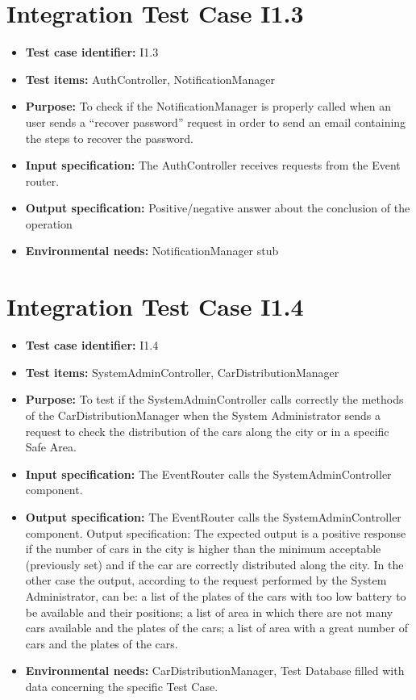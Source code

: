 \section{Integration Test Case I1.3}
\begin{itemize}
\item \textbf{Test case identifier:} I1.3
\item \textbf{Test items:} AuthController, NotificationManager
\item \textbf{Purpose:} To check if the NotificationManager is properly called when an user sends a “recover password” request in order to send an email containing the steps to recover the password.
\item \textbf{Input specification:} The AuthController receives requests from the Event router.
\item \textbf{Output specification:} Positive/negative answer about the conclusion of the operation
\item \textbf{Environmental needs:} NotificationManager stub
\end{itemize}

\section{Integration Test Case I1.4}
\begin{itemize}
\item \textbf{Test case identifier:} I1.4
\item \textbf{Test items:} SystemAdminController, CarDistributionManager
\item \textbf{Purpose:} To test if the SystemAdminController calls correctly the methods of the CarDistributionManager when the System Administrator sends a request to check the distribution of the cars along the city or in a specific Safe Area.
\item \textbf{Input specification:} The EventRouter calls the SystemAdminController component.
\item \textbf{Output specification:} The EventRouter calls the SystemAdminController component.
Output specification: The expected output is a positive response if the number of cars in the city is higher than the minimum acceptable (previously set) and if the car are correctly distributed along the city. In the other case the output, according to the request performed by the System Administrator, can be: a list of the plates of the cars with too low battery to be available and their positions; a list of area in which there are not many cars available and the plates of the cars; a list of area with a great number of cars and the plates of the cars.
\item \textbf{Environmental needs:} CarDistributionManager, Test Database filled with data concerning the specific Test Case.
\end{itemize}

